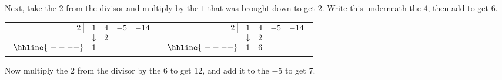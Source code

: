 \bigskip

\newpage

Next, take the $2$ from the divisor and multiply by the $1$ that was brought down to get $2$.  Write this underneath the $4$, then add to get $6$.

\bigskip

\begin{center}

\begin{tabular}{cc}

$ \begin{array}{rrrrr}


  2 \, \, \vline& 1 & 4 & -5  & -14 \\

   & \downarrow  &  2  &    &  \\ \hhline{~----} 
  & 1  &     &   &    \\  
\end{array}$ \hspace{1in}
&


$ \begin{array}{rrrrr}


  2 \, \, \vline& 1 & 4 & -5  & -14 \\

   & \downarrow &  2  &    &  \\ \hhline{~----} 
  & 1  &   6  &   &    \\  
\end{array}$ \\


\end{tabular}

\end{center}

\bigskip

Now multiply the $2$ from the divisor by the $6$ to get $12$, and add it to the $-5$ to get $7$.

\bigskip

